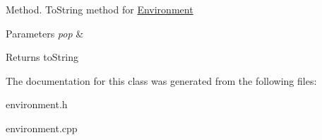Method. To\+String method for \hyperlink{class_environment}{Environment} 
\begin{DoxyParams}{Parameters}
{\em pop} & \\
\hline
\end{DoxyParams}
\begin{DoxyReturn}{Returns}
to\+String 
\end{DoxyReturn}


The documentation for this class was generated from the following files\+:\begin{DoxyCompactItemize}
\item 
environment.\+h\item 
environment.\+cpp\end{DoxyCompactItemize}

